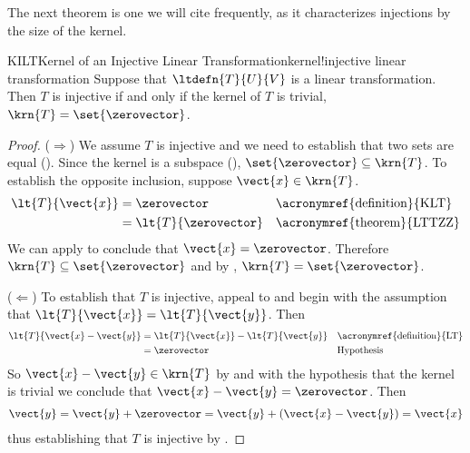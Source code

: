 %
The next theorem is one we will cite frequently, as it characterizes injections by the size of the kernel.
%
\begin{theorem}{KILT}{Kernel of an Injective Linear Transformation}{kernel!injective linear transformation}
Suppose that $\ltdefn{T}{U}{V}$ is a linear transformation.  Then $T$ is injective if and only if the kernel of $T$ is trivial, $\krn{T}=\set{\zerovector}$.
\end{theorem}
%
\begin{proof}
($\Rightarrow$) We assume $T$ is injective and we need to establish that two sets are equal ().  Since the kernel is a subspace (), $\set{\zerovector}\subseteq\krn{T}$.  To establish the opposite inclusion, suppose $\vect{x}\in\krn{T}$.  
%
\begin{align*}
\lt{T}{\vect{x}}
&=\zerovector&&\text{\acronymref{definition}{KLT}}\\
%
&=\lt{T}{\zerovector}
&&\text{\acronymref{theorem}{LTTZZ}}
%
\end{align*}
%
We can apply  to conclude that $\vect{x}=\zerovector$.  Therefore $\krn{T}\subseteq\set{\zerovector}$ and by , $\krn{T}=\set{\zerovector}$.\par
%
($\Leftarrow$)  To establish that $T$ is injective, appeal to  and begin with the assumption that $\lt{T}{\vect{x}}=\lt{T}{\vect{y}}$.  Then
%
\begin{align*}
\lt{T}{\vect{x}-\vect{y}}
&=\lt{T}{\vect{x}}-\lt{T}{\vect{y}}
&&\text{\acronymref{definition}{LT}}\\
%
&=\zerovector
&&\text{Hypothesis}
%
\end{align*}
%
So $\vect{x}-\vect{y}\in\krn{T}$ by  and with the hypothesis that the kernel is trivial we conclude that $\vect{x}-\vect{y}=\zerovector$.  Then
%
\begin{align*}
\vect{y}
=\vect{y}+\zerovector
=\vect{y}+\left(\vect{x}-\vect{y}\right)
=\vect{x}
\end{align*}
%
thus establishing that $T$ is injective by .
%
\end{proof}
%
